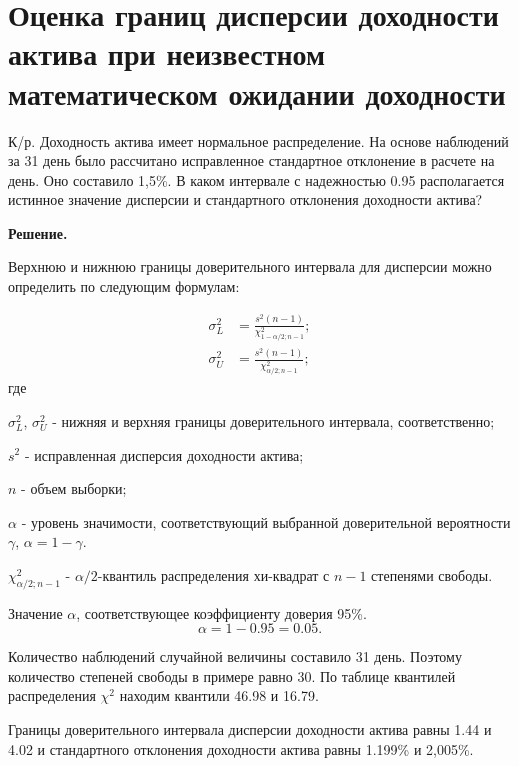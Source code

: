 \documentclass[12pt,a4paper]{article}
\begin{document}
\section{Оценка границ дисперсии доходности актива при неизвестном математическом ожидании доходности}
\begin{taskrus}К/р. 
Доходность актива имеет нормальное распределение. На основе наблюдений за 31 день было рассчитано исправленное стандартное отклонение в расчете на день. Оно составило 1,5\%. В каком интервале с надежностью 0.95 располагается истинное значение дисперсии и стандартного отклонения доходности актива?

\textbf{Решение.}

Верхнюю и нижнюю границы доверительного интервала для дисперсии можно определить по следующим формулам:

\begin{align}
\sigma_L^2&=\frac{s^2(n-1)}{\chi_{1-\alpha/2;n-1}^2};\\[8pt]
\sigma_U^2&=\frac{s^2(n-1)}{\chi_{\alpha/2;n-1}^2};
\end{align}
где

$\sigma_L^2$, $\sigma_U^2$ - нижняя и верхняя границы доверительного интервала, соответственно;

$s^2$ - исправленная дисперсия доходности актива;

$n$ - объем выборки;

$\alpha$ - уровень значимости, соответствующий выбранной доверительной вероятности $\gamma$, $\alpha=1-\gamma$. 

$\chi_{\alpha/2;n-1}^2$ - $\alpha/2$-квантиль распределения хи-квадрат с $n-1$ степенями свободы.

Значение $\alpha$, соответствующее коэффициенту доверия 95\%.
$$\alpha=1-0.95=0.05.$$

Количество наблюдений случайной величины составило 31 день. Поэтому количество степеней свободы в примере равно 30. По таблице квантилей распределения $\chi^2$ находим квантили 46.98 и 16.79.

Границы доверительного интервала дисперсии доходности актива равны 1.44 и 4.02 и стандартного отклонения доходности актива равны 1.199\% и 2,005\%.



\end{taskrus}
\end{document}
